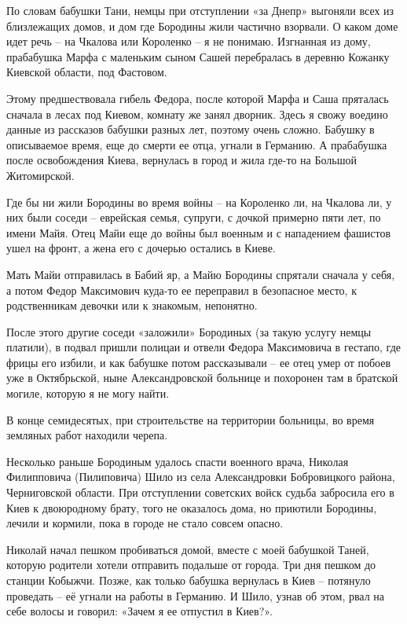 По словам бабушки Тани, немцы при отступлении «за Днепр» выгоняли всех из близлежащих домов, и дом где Бородины жили частично взорвали. О каком доме идет речь – на Чкалова или Короленко – я не понимаю. Изгнанная из дому, прабабушка Марфа с маленьким сыном Сашей перебралась в деревню Кожанку Киевской области, под Фастовом. 

Этому предшествовала гибель Федора, после которой Марфа и Саша пряталась сначала в лесах под Киевом, комнату же занял дворник. Здесь я свожу воедино данные из рассказов бабушки разных лет, поэтому очень сложно. Бабушку в описываемое время, еще до смерти ее отца, угнали в Германию. А прабабушка после освобождения Киева, вернулась в город и жила где-то на Большой Житомирской.

Где бы ни жили Бородины во время войны – на Короленко ли, на Чкалова ли, у них были соседи – еврейская семья, супруги, с дочкой примерно пяти лет, по имени Майя. Отец Майи еще до войны был военным и с нападением фашистов ушел на фронт, а жена его с дочерью остались в Киеве.

Мать Майи отправилась в Бабий яр, а Майю Бородины спрятали сначала у себя, а потом Федор Максимович куда-то ее переправил в безопасное место, к родственникам девочки или к знакомым, непонятно.

После этого другие соседи «заложили» Бородиных (за такую услугу немцы платили), в подвал пришли полицаи и отвели Федора Максимовича в гестапо, где фрицы его избили, и как бабушке потом рассказывали – ее отец умер от побоев уже в Октябрьской, ныне Александровской больнице и похоронен там в братской могиле, которую я не могу найти.

В конце семидесятых, при строительстве на территории больницы, во время земляных работ находили черепа.

Несколько раньше Бородиным удалось спасти военного врача, Николая Филипповича (Пилиповича) Шило из села Александровки Бобровицкого района, Черниговской области. При отступлении советских войск судьба забросила его в Киев к двоюродному брату, того не оказалось дома, но приютили Бородины, лечили и кормили, пока в городе не стало совсем опасно. 

Николай начал пешком пробиваться домой, вместе с моей бабушкой Таней, которую родители хотели отправить подальше от города. Три дня пешком до станции Кобыжчи. Позже, как только бабушка вернулась в Киев – потянуло проведать – её угнали на работы в Германию. И Шило, узнав об этом, рвал на себе волосы и говорил: «Зачем я ее отпустил в Киев?».


